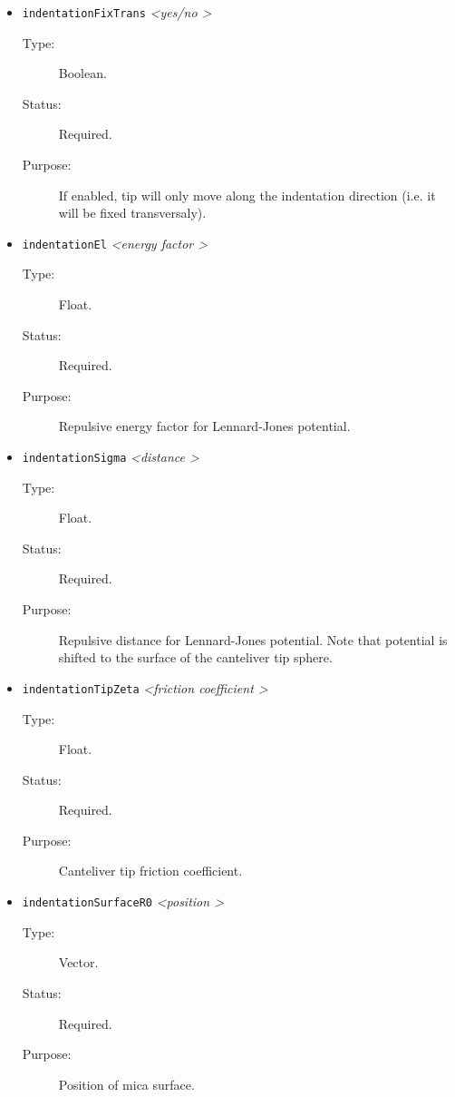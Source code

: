 \documentclass[a4paper]{article}
\begin{document}
\begin{itemize}
\item \texttt{indentationFixTrans} \textit{\textless yes/no \textgreater}
\begin{description}
\item[Type:] Boolean.
\item[Status:] Required.
\item[Purpose:] If enabled, tip will only move along the indentation direction (i.e. it will be fixed transversaly).
\end{description}

\item \texttt{indentationEl} \textit{\textless energy factor \textgreater}
\begin{description}
\item[Type:] Float.
\item[Status:] Required.
\item[Purpose:] Repulsive energy factor for Lennard-Jones potential.
\end{description}

\item \texttt{indentationSigma} \textit{\textless distance \textgreater}
\begin{description}
\item[Type:] Float.
\item[Status:] Required.
\item[Purpose:] Repulsive distance for Lennard-Jones potential. Note that potential is shifted to the surface of the canteliver tip sphere.
\end{description}

\item \texttt{indentationTipZeta} \textit{\textless friction coefficient \textgreater}
\begin{description}
\item[Type:] Float.
\item[Status:] Required.
\item[Purpose:] Canteliver tip friction coefficient.
\end{description}

\item \texttt{indentationSurfaceR0} \textit{\textless position \textgreater}
\begin{description}
\item[Type:] Vector.
\item[Status:] Required.
\item[Purpose:] Position of mica surface.
\end{description}


\end{itemize}
\end{document}
